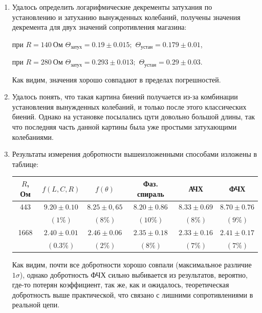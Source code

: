 \documentclass[a4paper,12pt]{extarticle}
\begin{document}
\begin{enumerate}
    \item Удалось определить логарифмические декременты затухания по установлению и затуханию вынужденных колебаний, получены значения декремента для двух значений сопротивления магазина:

    при $R = 140 \ \text{Ом}$ $\Theta_\text{затух} = 0.19 \pm 0.015;$ $\Theta_\text{устан} = 0.179 \pm 0.01$,

    при $R = 280 \ \text{Ом}$ $\Theta_\text{затух} = 0.293 \pm 0.013;$ $\Theta_\text{устан} = 0.29 \pm 0.03$.

    Как видим, значения хорошо совпадают в пределах погрешностей.

    \item Удалось понять, что такая картина биений получается из-за комбинации установления вынужденных колебаний, и только после этого классических биений. Однако на установке посылались цуги довольно большой длины, так что последняя часть данной картины была уже простыми затухающими колебаниями.

    \item Результаты измерения добротности вышеизложенными способами изложены в таблице:

    \begin{table}[h]
        \centering
        \begin{tabular}{|c|c|c|c|c|c|}
                \hline
                $R$, Ом & $f(L, C, R)$ & $f(\theta)$ & Фаз. спираль & АЧХ & ФЧХ \\ \hline
                443 & $9.20 \pm 0.10$ & $8.25 \pm 0,65$& $8.20 \pm 0.86$ & $8.33 \pm 0.69$ & $8.70\pm 0.76$ \\
                & $(1\%)$ & $(8\%)$ & $(10\%)$ & $(8\%)$ & $(9\%)$  \\ \hline
                1668 & $2.40 \pm 0.01$ & $ 2.46 \pm 0.06$ & $ 2.35 \pm 0.18$ & $2.33 \pm 0.16  $ & $2.41 \pm 0.17 $ \\
                & $(0.3 \%)$ & $(2\%) $ & $(8\%) $ & $(7 \%) $ & $(7 \%) $ \\ \hline
        \end{tabular}
    \end{table}

    Как видим, почти все добротности хорошо совпали (максимальное различие $1 \sigma$), однако добротность ФЧХ сильно выбивается из результатов, вероятно, где-то потерян коэффициент, так же, как и ожидалось, теоретическая добротность выше практической, что связано с лишними сопротивлениями в реальной цепи.


\end{enumerate}
\end{document}
